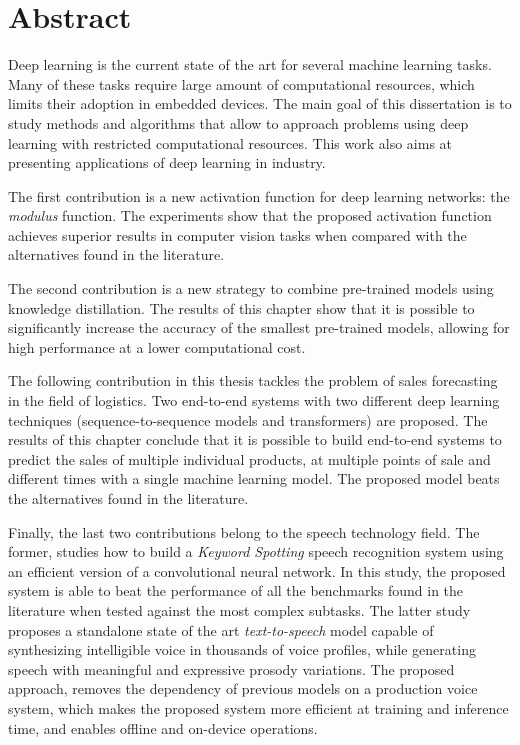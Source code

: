 
\chapter*{Abstract}


Deep learning is the current state of the art for several machine learning tasks. Many of these tasks require large amount of computational resources, which limits their adoption in embedded devices. The main goal of this dissertation is to study methods and algorithms that allow to approach problems using deep learning with restricted computational resources. This work also aims at presenting applications of deep learning in industry.

The first contribution is a new activation function for deep learning networks: the \textit{modulus} function. The experiments show that the proposed activation function achieves superior results in computer vision tasks when compared with the alternatives found in the literature.

The second contribution is a new strategy to combine pre-trained models using knowledge distillation. The results of this chapter show that it is possible to significantly increase the accuracy of the smallest pre-trained models, allowing for high performance at a lower computational cost.

The following contribution in this thesis tackles the problem of sales forecasting in the field of logistics. Two end-to-end systems with two different deep learning techniques (sequence-to-sequence models and transformers) are proposed. The results of this chapter conclude that it is possible to build end-to-end systems to predict the sales of multiple individual products, at multiple points of sale and different times with a single machine learning model. The proposed model beats the alternatives found in the literature.

Finally, the last two contributions belong to the speech technology field. The former, studies how to build a \textit{Keyword Spotting} speech recognition system using an efficient version of a convolutional neural network. In this study, the proposed system is able to beat the performance of all the benchmarks found in the literature when tested against the most complex subtasks. The latter study proposes a standalone state of the art \textit{text-to-speech} model capable of synthesizing intelligible voice in thousands of voice profiles, while generating speech with meaningful and expressive prosody variations. The proposed approach, removes the dependency of previous models on a production voice system, which makes the proposed system more efficient at training and inference time, and enables offline and on-device operations. 





\clearpage
